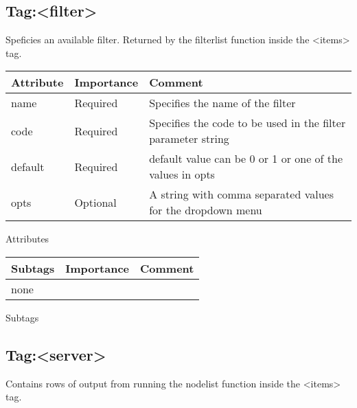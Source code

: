 \documentclass[a4paper]{article}
\newcommand{\xml}[1]{\textless#1\textgreater}
\begin{document}
    \subsection{Tag:\xml{filter}  }
        Speficies an available filter. Returned by the filterlist function 
        inside the \xml{items} tag.
    \begin{center}
        \begin{tabular}{ | p{2.1cm} | p{2cm} | p{9cm} |}
        \hline
        \textbf{Attribute} & \textbf{Importance} & \textbf{Comment}  
        \\ \hline
        name & Required & Specifies the name of the filter
        \\ \hline
        code & Required & Specifies the code to be used in the filter parameter string 
        \\ \hline
        default & Required & default value can be 0 or 1 or one of the values in opts
        \\ \hline
        opts & Optional & A string with comma separated values for the dropdown menu
        \\ \hline
        \end{tabular}
        \small Attributes
        
        \begin{tabular}{ | p{2.1cm} | p{2cm} | p{9cm} |}
        \hline
        \textbf{Subtags} & \textbf{Importance} & \textbf{Comment}  
        \\ \hline
        none
        & &
        \\ \hline
        \end{tabular}
        
        \small Subtags
    \end{center}        
        
        
    \subsection{Tag:\xml{server}  }
    
    Contains rows of output from running the nodelist function inside the 
    \xml{items} tag.
\end{document}
